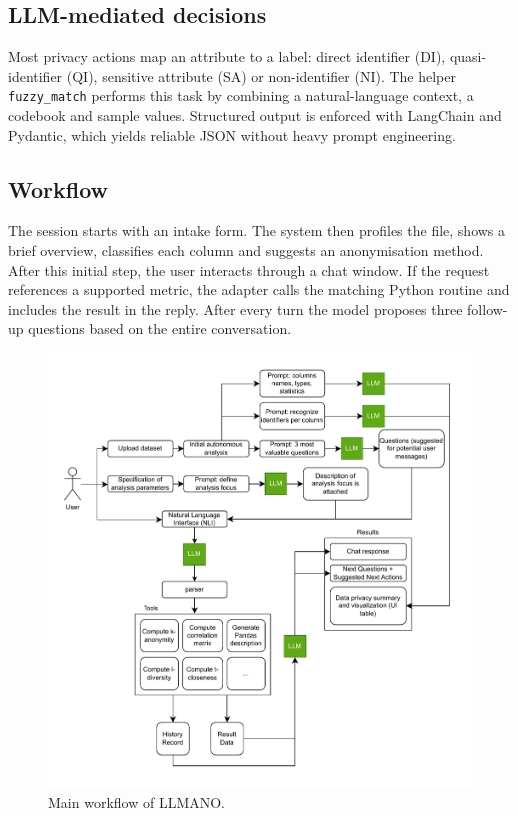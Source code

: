 \documentclass{article}
\begin{document}
\subsection{LLM-mediated decisions}

Most privacy actions map an attribute to a label: direct identifier (DI), quasi-identifier (QI), sensitive attribute (SA) or non-identifier (NI).  
The helper \texttt{fuzzy\_match} performs this task by combining a natural-language context, a codebook and sample values.  
Structured output is enforced with LangChain and Pydantic, which yields reliable JSON without heavy prompt engineering.

\subsection{Workflow}

The session starts with an intake form.  
The system then profiles the file, shows a brief overview, classifies each column and suggests an anonymisation method.  
After this initial step, the user interacts through a chat window.  
If the request references a supported metric, the adapter calls the matching Python routine and includes the result in the reply.  
After every turn the model proposes three follow-up questions based on the entire conversation.

\begin{figure}[h]
    \centering
    \includegraphics[width=0.85\linewidth]{images/workflow_diagram.pdf}
    \caption{Main workflow of LLMANO.}
    \label{fig:workflow-diagram}
\end{figure}
\end{document}
